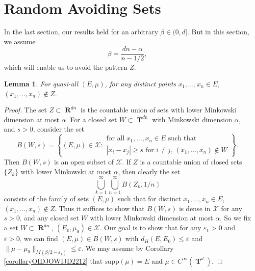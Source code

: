 \documentclass[12pt,reqno]{article}
\numberwithin{equation}{section}
\DeclareMathOperator{\RR}{\mathbf{R}}
\DeclareMathOperator{\TT}{\mathbf{T}}
\newtheorem{lemma}{Lemma}
\begin{document}
\section{Random Avoiding Sets} 

In the last section, our results held for an arbitrary $\beta \in (0,d]$. But in this section, we assume
%
\[ \beta = \frac{dn - \alpha}{n - 1/2}, \]
%
which will enable us to avoid the pattern $Z$.

\begin{lemma}
    For quasi-all $(E,\mu)$, for any distinct points $x_1, \dots, x_n \in E$, $(x_1, \dots, x_n) \not \in Z$.
\end{lemma}
\begin{proof}
    The set $Z \subset \RR^{dn}$ is the countable union of sets with lower Minkowski dimension at most $\alpha$. For a closed set $W \subset \TT^{dn}$ with Minkowski dimension $\alpha$, and $s > 0$, consider the set
    \[ B(W,s) = \left\{ (E,\mu) \in \mathcal{X}: \begin{array}{c}
            \text{for all $x_1, \dots, x_n \in E$ such that}\\
            \text{$|x_i - x_j| \geq s$ for $i \neq j$, $(x_1, \dots, x_n) \not \in W$}
        \end{array} \right\}. \]
    Then $B(W,s)$ is an open subset of $\mathcal{X}$. If $Z$ is a countable union of closed sets $\{ Z_k \}$ with lower Minkowski at most $\alpha$, then clearly the set
    \[ \bigcup_{k = 1}^\infty \bigcup_{n = 1}^\infty B(Z_k,1/n) \]
    consists of the family of sets $(E,\mu)$ such that for distinct $x_1, \dots, x_n \in E$, $(x_1, \dots, x_n) \not \in Z$. Thus it suffices to show that $B(W,s)$ is dense in $\mathcal{X}$ for any $s > 0$, and any closed set $W$ with lower Minkowski dimension at most $\alpha$. So we fix a set $W \subset \RR^{dn}$, $(E_0,\mu_0) \in \mathcal{X}$. Our goal is to show that for any $\varepsilon_1 > 0$ and $\varepsilon > 0$, we can find $(E,\mu) \in B(W,s)$ with $d_H(E,E_0) \leq \varepsilon$ and $\| \mu - \mu_0 \|_{M(\beta/2 - \varepsilon_1)} \leq \varepsilon$. We may assume by Corollary \ref{corollaryOIDJOWIJD2212} that $\text{supp}(\mu) = E$ and $\mu \in C^\infty(\TT^d)$.


\end{proof}
\end{document}
